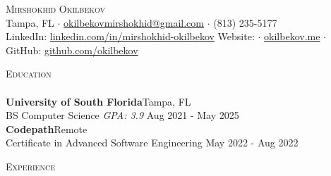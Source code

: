\documentclass[a4paper]{article}
\newcommand{\lineunder} {
    \vspace*{-8pt} \\
    \hspace*{-18pt} \hrulefill \\
}
\newcommand{\header} [1] {
    {\hspace*{-18pt}\vspace*{6pt} \textsc{#1}}
    \vspace*{-6pt} \lineunder
}
\begin{document}
\vspace*{-40pt}

    

\vspace*{-10pt}
\begin{center}
	{\Huge \scshape {Mirshokhid Okilbekov}}\\
	Tampa, FL $\cdot$ \href{mailto:okilbekovmirshokhid@gmail.com}{okilbekovmirshokhid@gmail.com} $\cdot$ (813) 235-5177 \\ LinkedIn: \href{https://linkedin.com/in/mirshokhid-okilbekov}{linkedin.com/in/mirshokhid-okilbekov} Website: $\cdot$ \href{https://okilbekov.me}{okilbekov.me} $\cdot$ GitHub: \href{https://github.com/okilbekov}{github.com/okilbekov} \\
\end{center}

{\Large \header{Education}}
\textbf{University of South Florida}\hfill Tampa, FL\\
BS Computer Science \textit{GPA: 3.9} \hfill Aug 2021 - May 2025\\
\vspace{2mm}
\textbf{Codepath}\hfill Remote\\
Certificate in Advanced Software Engineering \hfill May 2022 - Aug 2022\\
\vspace{1mm}

{\Large \header{Experience}}
\end{document}
